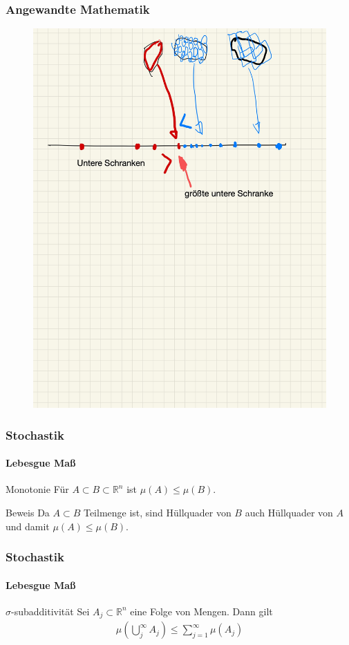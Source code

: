 \documentclass{beamer}
\begin{document}
\begin{frame}
    \frametitle{Angewandte Mathematik}

\begin{figure}[H]
      \centering
    \includegraphics[width=0.8 \textwidth]{img/untereschranke}
      \caption{}
\end{figure}
 \end{frame}



\begin{frame}
    \frametitle{Stochastik}
\framesubtitle{Lebesgue Maß}
    \begin{block}{Monotonie}
Für $A \subset B \subset \mathbb{R}^n$ ist $\mu(A) \leq \mu(B)$.
\end{block}

    \begin{block}{Beweis}
Da $A \subset B$ Teilmenge ist, sind Hüllquader von $B$  auch Hüllquader von $A$ und damit  $\mu(A) \leq \mu(B)$.
\end{block}
 \end{frame}


\begin{frame}
    \frametitle{Stochastik}
\framesubtitle{Lebesgue Maß}
    \begin{block}{$\sigma$-subadditivität}
Sei $A_j \subset \mathbb{R}^n$ eine Folge von Mengen. Dann gilt
\begin{align*}
\mu (\bigcup_j^{\infty} A_j ) \leq \sum_{j=1}^{\infty} \mu(A_j)
\end{align*}
\end{block}
 \end{frame}
\end{document}
